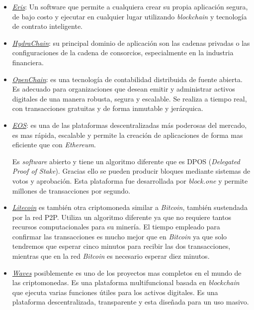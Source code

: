 \begin{itemize}
	\item \underline{\textit{Eris}}: Un software que permite a cualquiera crear su propia aplicación segura, de bajo costo y ejecutar en cualquier lugar utilizando \textit{blockchain} y tecnología de contrato inteligente.
	\item \underline{\textit{HydraChain}}: su principal dominio de aplicación son las cadenas privadas o las configuraciones de la cadena de consorcios, especialmente en la industria financiera.
	\item \underline{\textit{OpenChain}}: es una tecnología de contabilidad distribuida de fuente abierta. Es adecuado para organizaciones que desean emitir y administrar activos digitales de una manera robusta, segura y escalable. Se realiza a tiempo real, con transacciones gratuitas y de forma inmutable y jerárquica.
	\item \underline{\textit{EOS}}\cite{eos}: es una de las plataformas descentralizadas más poderosas del mercado, es mas rápida, escalable y permite la creación de aplicaciones de forma mas eficiente que con \textit{Ethereum}.

	Es \textit{software} abierto y tiene un algoritmo diferente que es DPOS (\textit{Delegated Proof of Stake}). Gracias ello se pueden producir bloques mediante sistemas de votos y aprobación. 
	Esta plataforma fue desarrollada por \textit{block.one} y permite  millones de transacciones por segundo.	
	
	\item \underline{\textit{Litecoin}}\cite{litecoin} es también otra criptomoneda similar a \textit{Bitcoin}, también sustendada por la red P2P. Utiliza un algoritmo diferente ya que no requiere tantos recursos computacionales para su minería. El tiempo empleado para confirmar las transacciones es mucho mejor que en \textit{Bitcoin} ya que solo tendremos que esperar cinco minutos para recibir las dos transacciones, mientras que en la red \textit{Bitcoin} es necesario esperar diez minutos.
	 
	\item \underline{\textit{Waves}}\cite{waves} posiblemente es uno de los proyectos mas completos en el mundo de las criptomonedas. Es una plataforma multifuncional basada en \textit{blockchain} que ejecuta varias funciones útiles para los activos digitales. Es una plataforma descentralizada, transparente y esta diseñada para un uso masivo.
	\end{itemize}

